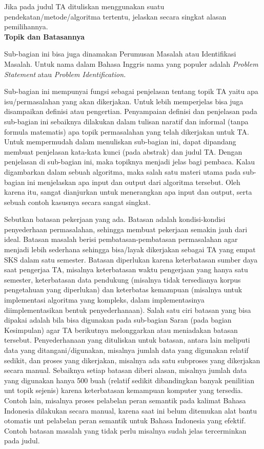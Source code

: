 Jika pada judul TA dituliskan menggunakan suatu pendekatan/metode/algoritma tertentu, jelaskan secara singkat alasan pemilihannya.\\

\noindent\textbf{Topik dan Batasannya}

Sub-bagian ini bisa juga dinamakan Perumusan Masalah atau Identifikasi Masalah. Untuk nama dalam Bahasa Inggris nama yang populer adalah \textit{Problem Statement} atau \textit{Problem Identification.}

Sub-bagian ini mempunyai fungsi sebagai penjelasan tentang topik TA yaitu apa isu/permasalahan yang akan dikerjakan. Untuk lebih memperjelas bisa juga disampaikan definisi atau pengertian. Penyampaian definisi dan penjelasan pada sub-bagian ini sebaiknya dilakukan dalam tulisan naratif dan informal (tanpa formula matematis) apa topik permasalahan yang telah dikerjakan untuk TA. Untuk mempermudah dalam menuliskan sub-bagian ini, dapat dipandang membuat penjelasan kata-kata kunci (pada abstrak) dan judul TA. Dengan penjelasan di sub-bagian ini, maka topiknya menjadi jelas bagi pembaca. Kalau digambarkan dalam sebuah algoritma, maka salah satu materi utama pada sub-bagian ini menjelaskan apa input dan output dari algoritma tersebut. Oleh karena itu, sangat dianjurkan untuk menerangkan apa input dan output, serta sebuah contoh kasusnya secara sangat singkat.

Sebutkan batasan pekerjaan yang ada. Batasan adalah kondisi-kondisi penyederhaan permasalahan, sehingga membuat pekerjaan semakin jauh dari ideal. Batasan masalah berisi pembatasan-pembatasan permasalahan agar menjadi lebih sederhana sehingga bisa/layak dikerjakan sebagai TA yang empat SKS dalam satu semester. Batasan diperlukan karena keterbatasan sumber daya saat pengerjaa TA, misalnya keterbatasan waktu pengerjaan yang hanya satu semester, keterbatasan data pendukung (misalnya tidak tersedianya korpus pengetahuan yang diperlukan) dan keterbatas kemampuan (misalnya untuk implementasi algoritma yang kompleks, dalam implementasinya diimplementasikan bentuk penyederhanaan). Salah satu ciri batasan yang bisa dipakai adalah bila bisa digunakan pada sub-bagian Saran (pada bagian Kesimpulan) agar TA berikutnya melonggarkan atau meniadakan batasan tersebut. Penyederhanaan yang dituliskan untuk batasan, antara lain meliputi data yang ditangani/digunakan, misalnya  jumlah data yang digunakan relatif sedikit, dan proses yang dikerjakan, misalnya ada satu subproses yang dikerjakan secara manual. Sebaiknya setiap batasan diberi alasan, misalnya jumlah data yang digunakan hanya 500 buah (relatif sedikit dibandingkan banyak penilitian unt topik sejenis) karena keterbatasan kemampuan komputer yang tersedia. Contoh lain, misalnya proses pelabelan peran semantik pada kalimat Bahasa Indonesia dilakukan secara manual, karena saat ini belum ditemukan alat bantu otomatis unt pelabelan peran semantik untuk Bahasa Indonesia yang efektif. Contoh batasan masalah yang tidak perlu misalnya sudah jelas tercerminkan pada judul.\\

